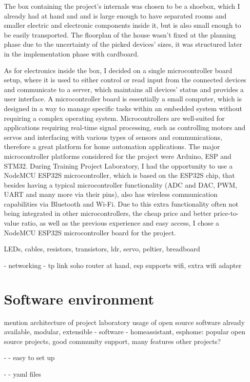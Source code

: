 The box containing the project's internals was chosen to be a shoebox, which I already had at hand and and is large enough to have separated rooms and smaller electric and electronic components inside it, but is also small enough to be easily transported. The floorplan of the house wasn't fixed at the planning phase due to the uncertainty of the picked devices' sizes, it was structured later in the implementation phase with cardboard.

As for electronics inside the box, I decided on a single microcontroller board setup, where it is used to either control or read input from the connected devices and communicate to a server, which maintains all devices' status and provides a user interface. A microcontroller board is essentially a small computer, which is designed in a way to manage specific tasks within an embedded system without requiring a complex operating system. \cite{IBMmicrocontroller} Microcontrollers are well-suited for applications requiring real-time signal processing, such as controlling motors and servos and interfacing with various types of sensors and communications, therefore a great platform for home automation applications. The major microcontroller platforms considered for the project were Arduino, ESP and STM32. During Training Project Laboratory, I had the opportunity to use a NodeMCU ESP32S microcontroller, which is based on the ESP32S chip, that besides having a typical microcontroller functionality (ADC and DAC, PWM, UART and many more via their pins), also has wireless communication capabilities via Bluetooth and Wi-Fi. Due to this extra functionality often not being integrated in other microcontrollers, the cheap price and better price-to-value ratio, as well as the previous experience and easy access, I chose a NodeMCU ESP32S microcontroller board for the project. \cite{ESPvArduino} \cite{ESPvSTM}


LEDs, cables, resistors, transistors, ldr, servo, peltier, breadboard

- networking - tp link soho router at hand, esp supports wifi, extra wifi adapter

\section{Software environment}

mention architecture of project laboratory
usage of open source software already available, modular, extensible
- software - homeassistant, esphome: popular open source projects, good community support, many features
other projects?

- - easy to set up

- - yaml files
